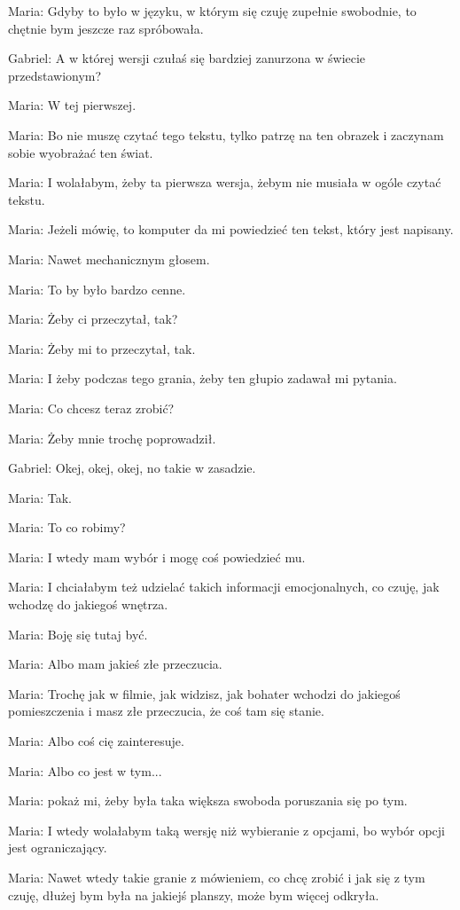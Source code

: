 Maria: Gdyby to było w języku, w którym się czuję zupełnie swobodnie, to chętnie bym jeszcze raz spróbowała.

Gabriel: A w której wersji czułaś się bardziej zanurzona w świecie przedstawionym?

Maria: W tej pierwszej.

Maria: Bo nie muszę czytać tego tekstu, tylko patrzę na ten obrazek i zaczynam sobie wyobrażać ten świat.

Maria: I wolałabym, żeby ta pierwsza wersja, żebym nie musiała w ogóle czytać tekstu.

Maria: Jeżeli mówię, to komputer da mi powiedzieć ten tekst, który jest napisany.

Maria: Nawet mechanicznym głosem.

Maria: To by było bardzo cenne.

Maria: Żeby ci przeczytał, tak?

Maria: Żeby mi to przeczytał, tak.

Maria: I żeby podczas tego grania, żeby ten głupio zadawał mi pytania.

Maria: Co chcesz teraz zrobić?

Maria: Żeby mnie trochę poprowadził.

Gabriel: Okej, okej, okej, no takie w zasadzie.

Maria: Tak.

Maria: To co robimy?

Maria: I wtedy mam wybór i mogę coś powiedzieć mu.

Maria: I chciałabym też udzielać takich informacji emocjonalnych, co czuję, jak wchodzę do jakiegoś wnętrza.

Maria: Boję się tutaj być.

Maria: Albo mam jakieś złe przeczucia.

Maria: Trochę jak w filmie, jak widzisz, jak bohater wchodzi do jakiegoś pomieszczenia i masz złe przeczucia, że coś tam się stanie.

Maria: Albo coś cię zainteresuje.

Maria: Albo co jest w tym...

Maria: pokaż mi, żeby była taka większa swoboda poruszania się po tym.

Maria: I wtedy wolałabym taką wersję niż wybieranie z opcjami, bo wybór opcji jest ograniczający.

Maria: Nawet wtedy takie granie z mówieniem, co chcę zrobić i jak się z tym czuję, dłużej bym była na jakiejś planszy, może bym więcej odkryła.

